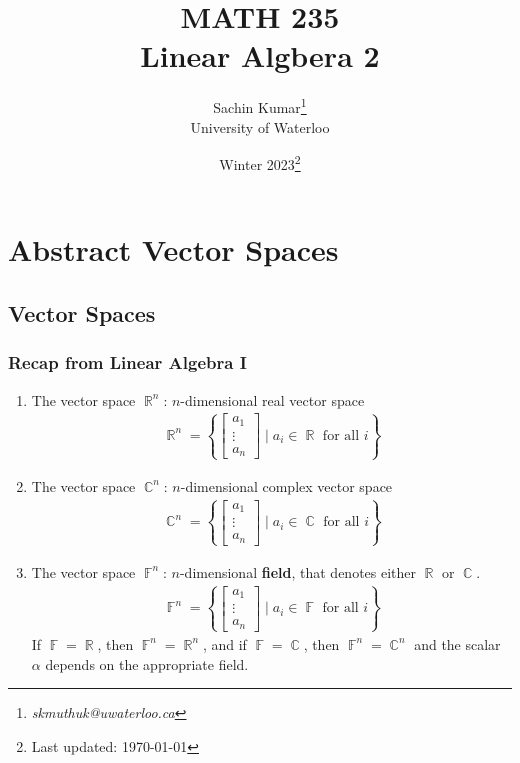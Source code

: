 \documentclass[10pt]{article}
\DeclareMathOperator{\R}{{\mathbb{R}}}
\DeclareMathOperator{\C}{{\mathbb{C}}}
\DeclareMathOperator{\F}{{\mathbb{F}}}
\theoremstyle{break}
\newcommand{\subject}{MATH 235 \\ Linear Algbera 2}
\newcommand{\semester}{Winter 2023}
\begin{document}
\let\ref\Cref

\title{\subject}
\author{Sachin Kumar\thanks{\itshape skmuthuk@uwaterloo.ca}\\ University of Waterloo}
\date{\semester\thanks{Last updated: \today}}

\maketitle
\newpage
\tableofcontents
\listoffigures
\listoftables
\newpage







\section{Abstract Vector Spaces}
\subsection{Vector Spaces}
\subsubsection{Recap from Linear Algebra I}
\begin{enumerate}
    \item The vector space $\R^n$: $n$-dimensional real vector space
        \begin{align*}
            \R^n = \left\{\begin{bmatrix} a_1 \\ \vdots \\ a_n\end{bmatrix} \mid a_i \in \R \text{ for all }i\right\}
        \end{align*}
    \item The vector space $\C^n$: $n$-dimensional complex vector space
        \begin{align*}
            \C^n = \left\{\begin{bmatrix} a_1 \\ \vdots \\ a_n\end{bmatrix} \mid a_i \in \C \text{ for all }i\right\}
        \end{align*}
    \item The vector space $\F^n$: $n$-dimensional \textbf{field}, that denotes either $\R$ or $\C$.
        \begin{align*}
            \F^n = \left\{\begin{bmatrix} a_1 \\ \vdots \\ a_n\end{bmatrix} \mid a_i \in \F \text{ for all }i\right\}
        \end{align*}
        If $\F = \R$, then $\F^n = \R^n$, and if $\F = \C$, then $\F^n = \C^n$ and the scalar $\alpha$ depends on the appropriate field.
\end{enumerate}
\end{document}
